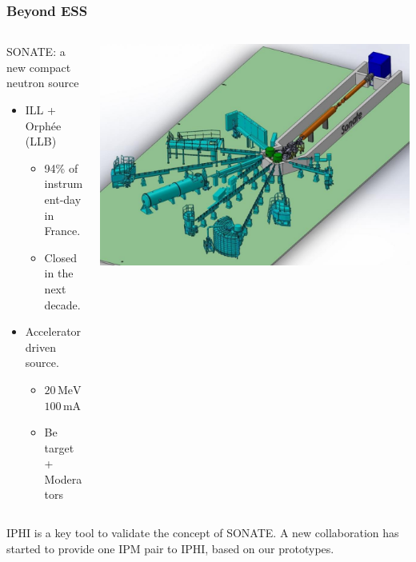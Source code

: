 \begin{frame}[t]
  \frametitle{Beyond ESS}
  \begin{columns}[]
    \begin{column}{0.45\textwidth}
      \begin{block}{SONATE: a new compact neutron source}
        \begin{itemize}
          \item ILL + Orphée (LLB)
                \begin{itemize}
                  \item 94\% of instrument-day in France.
                  \item Closed in the next decade.
                \end{itemize}
          \item Accelerator driven source.
                \begin{itemize}
                  \item $20\,\mathrm{MeV}$ $100\,\mathrm{mA}$
                  \item Be target + Moderators
                \end{itemize}
        \end{itemize}
      \end{block}
    \end{column}
    \begin{column}{0.45\textwidth}
      \includegraphics[width=1\textwidth]{05_Conclusion/fig/fig000_SONATE}
    \end{column}
  \end{columns}
  \begin{block}{IPHI is a key tool to validate the concept of SONATE.}
    A new collaboration has started to provide one IPM pair to IPHI, based on our prototypes.
  \end{block}
\end{frame}